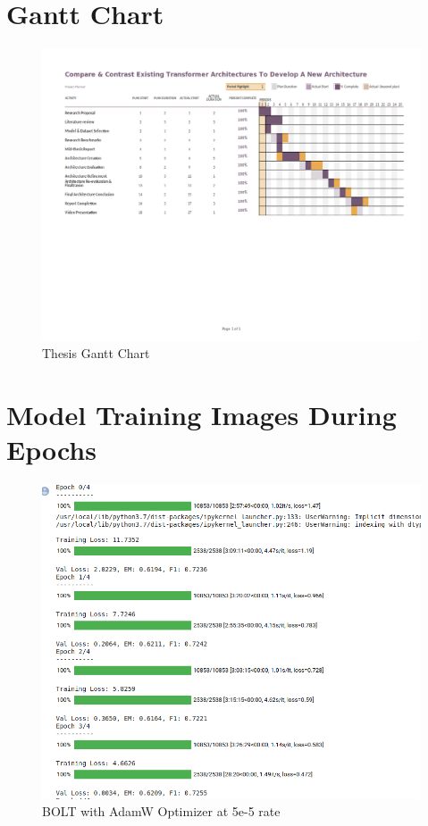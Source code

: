 \documentclass[a4paper,12pt]{report}
\begin{document}
   \begin{appendices}
    	\chapter{Gantt Chart}\label{cgc}
		    \begin{figure}[!h]
		       	\centering
		        \includegraphics[scale=0.55,angle=90]{../images/GanttChart-final.png}
		     	\caption{Thesis Gantt Chart}\label{ganttChartMid}
              \end{figure}
          \chapter{Model Training Images During Epochs}\label{modeltrainingimages}
          	\begin{figure}[!h]
          	\centering
          	\includegraphics[scale=0.35]{../images/AdamW5e.png}
          	\caption{BOLT with AdamW Optimizer at 5e-5 rate}\label{adam5e}
          \end{figure}
      

\end{appendices}
\end{document}
